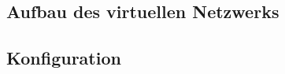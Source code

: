\subsection{Aufbau des virtuellen Netzwerks}

\clearpage
\pagebreak
\subsection{Konfiguration}

\clearpage
\pagebreak